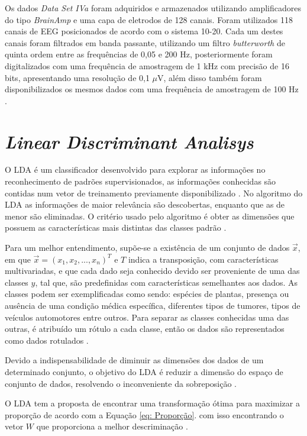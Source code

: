 Os dados \textit{Data Set IVa} foram adquiridos e armazenados utilizando amplificadores do tipo \textit{BrainAmp} e uma capa de eletrodos de 128 canais. Foram utilizados 118 canais de EEG posicionados de acordo com o sistema 10-20. Cada um destes canais foram filtrados em banda passante, utilizando um filtro \textit{butterworth} de quinta ordem entre as frequências de 0,05 e 200 Hz, posteriormente foram digitalizados com uma frequência de amostragem de 1 kHz com precisão de 16 bits, apresentando uma resolução de 0,1 $\mu$V, além disso também foram disponibilizados os mesmos dados com uma frequência de amostragem de 100 Hz \cite{siteBCI}.
 
\section{\textit{Linear Discriminant Analisys}}
O LDA é um classificador desenvolvido para explorar as informações no reconhecimento de padrões supervisionados,
as informações conhecidas são contidas num vetor de treinamento previamente disponibilizado \cite{izenmanLDA}.
No algoritmo do LDA as informações de maior relevância são descobertas, enquanto que as de menor são 
eliminadas. O critério usado pelo algoritmo é obter as dimensões que possuem as características mais
distintas das classes padrão \cite{korkmaz2017expert}.

Para um melhor entendimento, supõe-se a existência de um conjunto de dados $\vec x$, em que $\vec x = (x_1, x_2,...,x_n)^T$
e $T$ indica a transposição, com características multivariadas, e que cada dado
seja conhecido devido ser proveniente de uma das  classes $y$, tal que, são predefinidas com características
semelhantes aos dados. As classes podem ser exemplificadas como sendo: espécies de plantas,
presença ou ausência de uma condição médica específica, diferentes tipos de tumores, tipos de veículos automotores
entre outros. Para separar as classes conhecidas uma das outras, é atribuído um rótulo a cada classe, então os dados são
representados como dados rotulados \cite{izenmanLDA}.


Devido a indispensabilidade de diminuir as dimensões dos dados de um determinado conjunto, o objetivo do LDA
é reduzir a dimensão do espaço de conjunto de dados, resolvendo o inconveniente da sobreposição \cite{SinghLDA}.

O LDA tem a proposta de encontrar uma transformação ótima para maximizar a proporção de acordo com a Equação \ref{eq: Proporção}.
com isso encontrando o vetor $W$ que proporciona a melhor descriminação \cite{ketsuwan2017linear}.

